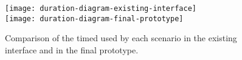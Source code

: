   \begin{figure}[tb]
    \centering
      {\texttt{[image: duration-diagram-existing-interface]}}%
      \\
    {\texttt{[image: duration-diagram-final-prototype]}}%
  \caption{Comparison of the timed used by each scenario in the existing interface and in the final prototype.}
    \label{fig:comparison_duration}
  \end{figure}